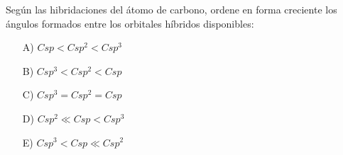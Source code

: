 \noindent Según las hibridaciones del átomo de carbono, ordene en forma creciente los ángulos formados entre los orbitales híbridos disponibles:
\begin{itemize}
	\item [A)] $Csp < Csp^{2} < Csp^{3}$ 
	\item [B)] $Csp^{3} < Csp^{2} < Csp$ 
	\item [C)] $Csp^{3} = Csp^{2} = Csp$
	\item [D)] $Csp^{2} \ll Csp < Csp^{3}$
	\item [E)] $Csp^{3} <Csp \ll Csp^{2}$
\end{itemize}